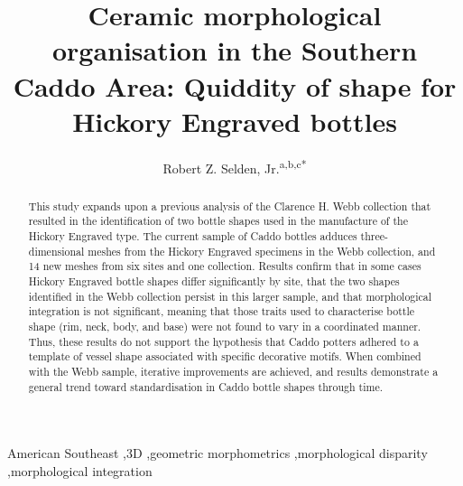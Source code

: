 \documentclass[review]{elsarticle}
\begin{document}
\begin{frontmatter}


\title{Ceramic morphological organisation in the Southern Caddo Area: Quiddity of shape for Hickory Engraved bottles}



\author{Robert Z. Selden, Jr.\textsuperscript{a,b,c*}}
\address[1]{Center for Regional Heritage Research, Stephen F. Austin State University, US}
\address[2]{Cultural Heritage Department, Jean Monnet University, FR}
\address[3]{ORCID ID \href{http://orcid.org/0000-0002-1789-8449}{0000-0002-1789-8449}}

\begin{abstract}
This study expands upon a previous analysis of the Clarence H. Webb collection that resulted in the identification of two bottle shapes used in the manufacture of the Hickory Engraved type. The current sample of Caddo bottles adduces three-dimensional meshes from the Hickory Engraved specimens in the Webb collection, and 14 new meshes from six sites and one collection. Results confirm that in some cases Hickory Engraved bottle shapes differ significantly by site, that the two shapes identified in the Webb collection persist in this larger sample, and that morphological integration is not significant, meaning that those traits used to characterise bottle shape (rim, neck, body, and base) were not found to vary in a coordinated manner. Thus, these results do not support the hypothesis that Caddo potters adhered to a template of vessel shape associated with specific decorative motifs. When combined with the Webb sample, iterative improvements are achieved, and results demonstrate a general trend toward standardisation in Caddo bottle shapes through time.
\end{abstract}

\begin{keyword}
American Southeast \sep 3D \sep geometric morphometrics \sep morphological disparity \sep morphological integration
\end{keyword}

\end{frontmatter}
\end{document}
